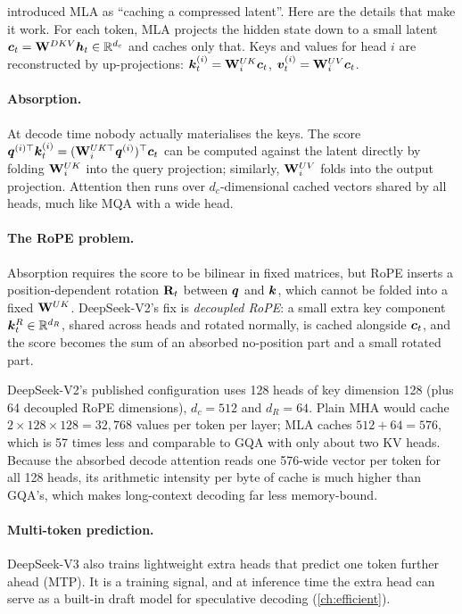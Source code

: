  introduced MLA as ``caching a compressed latent''. Here are the details that make it work.
For each token, MLA projects the hidden state down to a small latent $\bm{c}_t=\mathbf{W}^{DKV}\bm{h}_t\in\mathbb{R}^{d_c}$
and caches only that. Keys and values for head $i$ are reconstructed by up-projections:
$\bm{k}_t^{(i)}=\mathbf{W}^{UK}_i\bm{c}_t$, $\bm{v}_t^{(i)}=\mathbf{W}^{UV}_i\bm{c}_t$.

\paragraph{Absorption.} At decode time nobody actually materialises the keys. The score
$\bm{q}^{(i)\top}\bm{k}_t^{(i)}=(\mathbf{W}^{UK\top}_i\bm{q}^{(i)})^\top\bm{c}_t$ can be computed
against the latent directly by folding $\mathbf{W}^{UK}_i$ into the query projection; similarly,
$\mathbf{W}^{UV}_i$ folds into the output projection. Attention then runs over $d_c$-dimensional cached
vectors shared by all heads, much like MQA with a wide head.

\paragraph{The RoPE problem.} Absorption requires the score to be bilinear in fixed matrices, but RoPE
inserts a position-dependent rotation $\mathbf{R}_{t}$ between $\bm{q}$ and $\bm{k}$, which cannot be
folded into a fixed $\mathbf{W}^{UK}$. DeepSeek-V2's fix is \emph{decoupled RoPE}: a small extra key component
$\bm{k}^{R}_t\in\mathbb{R}^{d_R}$, shared across heads and rotated normally, is cached alongside $\bm{c}_t$, and
the score becomes the sum of an absorbed no-position part and a small rotated part.

\begin{napkinmath}
DeepSeek-V2's published configuration uses 128 heads of key dimension 128 (plus 64 decoupled RoPE dimensions),
$d_c=512$ and $d_R=64$. Plain MHA would cache $2\times128\times128=32{,}768$ values per token per layer; MLA
caches $512+64=576$, which is 57 times less and comparable to GQA with only about two KV heads. Because the
absorbed decode attention reads one 576-wide vector per token for all 128 heads, its arithmetic intensity
per byte of cache is much higher than GQA's, which makes long-context decoding far less memory-bound.
\end{napkinmath}

\paragraph{Multi-token prediction.} DeepSeek-V3 also trains lightweight extra heads that predict one token
further ahead (MTP). It is a training signal, and at inference time the extra head can serve as a built-in
draft model for speculative decoding (\cref{ch:efficient}).

